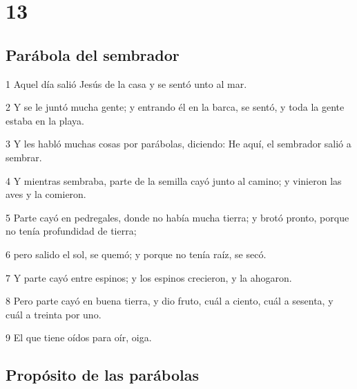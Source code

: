 \chapter{13}

\section*{Parábola del sembrador}

\par 1 Aquel día salió Jesús de la casa y se sentó unto al mar.
\par 2 Y se le juntó mucha gente; y entrando él en la barca, se sentó, y toda la gente estaba en la playa.
\par 3 Y les habló muchas cosas por parábolas, diciendo: He aquí, el sembrador salió a sembrar.
\par 4 Y mientras sembraba, parte de la semilla cayó junto al camino; y vinieron las aves y la comieron.
\par 5 Parte cayó en pedregales, donde no había mucha tierra; y brotó pronto, porque no tenía profundidad de tierra;
\par 6 pero salido el sol, se quemó; y porque no tenía raíz, se secó.
\par 7 Y parte cayó entre espinos; y los espinos crecieron, y la ahogaron.
\par 8 Pero parte cayó en buena tierra, y dio fruto, cuál a ciento, cuál a sesenta, y cuál a treinta por uno.
\par 9 El que tiene oídos para oír, oiga.

\section*{Propósito de las parábolas}

